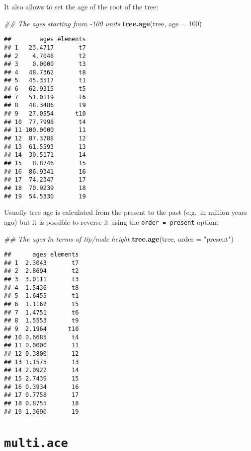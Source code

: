 \documentclass[
]{book}
\newenvironment{Shaded}{\begin{snugshade}}{\end{snugshade}}
\newcommand{\CommentTok}[1]{\textcolor[rgb]{0.56,0.35,0.01}{\textit{#1}}}
\newcommand{\DataTypeTok}[1]{\textcolor[rgb]{0.13,0.29,0.53}{#1}}
\newcommand{\DecValTok}[1]{\textcolor[rgb]{0.00,0.00,0.81}{#1}}
\newcommand{\KeywordTok}[1]{\textcolor[rgb]{0.13,0.29,0.53}{\textbf{#1}}}
\newcommand{\NormalTok}[1]{#1}
\newcommand{\StringTok}[1]{\textcolor[rgb]{0.31,0.60,0.02}{#1}}
\begin{document}
It also allows to set the age of the root of the tree:

\begin{Shaded}
\begin{Highlighting}[]
\CommentTok{\#\# The ages starting from {-}100 units}
\KeywordTok{tree.age}\NormalTok{(tree, }\DataTypeTok{age =} \DecValTok{100}\NormalTok{)}
\end{Highlighting}
\end{Shaded}

\begin{verbatim}
##        ages elements
## 1   23.4717       t7
## 2    4.7048       t2
## 3    0.0000       t3
## 4   48.7362       t8
## 5   45.3517       t1
## 6   62.9315       t5
## 7   51.0119       t6
## 8   48.3486       t9
## 9   27.0554      t10
## 10  77.7998       t4
## 11 100.0000       11
## 12  87.3788       12
## 13  61.5593       13
## 14  30.5171       14
## 15   8.8746       15
## 16  86.9341       16
## 17  74.2347       17
## 18  70.9239       18
## 19  54.5330       19
\end{verbatim}

Usually tree age is calculated from the present to the past (e.g.~in million years ago) but it is possible to reverse it using the \texttt{order\ =\ present} option:

\begin{Shaded}
\begin{Highlighting}[]
\CommentTok{\#\# The ages in terms of tip/node height}
\KeywordTok{tree.age}\NormalTok{(tree, }\DataTypeTok{order =} \StringTok{"present"}\NormalTok{)}
\end{Highlighting}
\end{Shaded}

\begin{verbatim}
##      ages elements
## 1  2.3043       t7
## 2  2.8694       t2
## 3  3.0111       t3
## 4  1.5436       t8
## 5  1.6455       t1
## 6  1.1162       t5
## 7  1.4751       t6
## 8  1.5553       t9
## 9  2.1964      t10
## 10 0.6685       t4
## 11 0.0000       11
## 12 0.3800       12
## 13 1.1575       13
## 14 2.0922       14
## 15 2.7439       15
## 16 0.3934       16
## 17 0.7758       17
## 18 0.8755       18
## 19 1.3690       19
\end{verbatim}

\hypertarget{multi.ace}{%
\section{\texorpdfstring{\texttt{multi.ace}}{multi.ace}}\label{multi.ace}}
\end{document}
